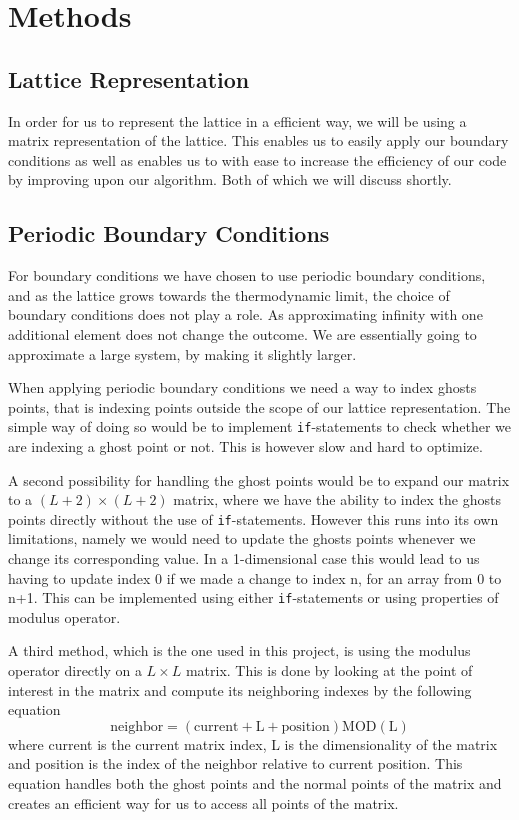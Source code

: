 \documentclass[%
reprint,
nofootinbib,
amsmath,amssymb,
aps,
]{revtex4-1}
\begin{document}
\section{Methods} %
\subsection{Lattice Representation} %
In order for us to represent the lattice in a efficient way, we will be using a matrix representation of the lattice. This enables us to easily apply our boundary conditions as well as enables us to with ease to increase the efficiency of our code by improving upon our algorithm. Both of which we will discuss shortly. 
\subsection{Periodic Boundary Conditions} %
For boundary conditions we have chosen to use periodic boundary conditions, and as the lattice grows towards the thermodynamic limit, the choice of boundary conditions does not play a role. As approximating infinity with one additional element does not change the outcome. We are essentially going to approximate a large system, by making it slightly larger. 

When applying periodic boundary conditions we need a way to index ghosts points, that is indexing points outside the scope of our lattice representation. The simple way of doing so would be to implement \texttt{if}-statements to check whether we are indexing a ghost point or not. This is however slow and hard to optimize. 

A second possibility for handling the ghost points would be to expand our matrix to a $(L+2)\times(L+2)$ matrix, where we have the ability to index the ghosts points directly without the use of \texttt{if}-statements. However this runs into its own limitations, namely we would need to update the ghosts points whenever we change its corresponding value. In a 1-dimensional case this would lead to us having to update index 0 if we made a change to index n, for an array from 0 to n+1. This can be implemented using either \texttt{if}-statements or using properties of modulus operator. 

A third method, which is the one used in this project, is using the modulus operator directly on a $L\times L$ matrix. This is done by looking at the point of interest in the matrix and compute its neighboring indexes by the following equation
\begin{equation}
	\text{neighbor} = (\text{current} + \text{L} + \text{position}) \text{MOD} (\text{L})
\end{equation}
where current is the current matrix index, L is the dimensionality of the matrix and position is the index of the neighbor relative to current position. 
This equation handles both the ghost points and the normal points of the matrix and creates an efficient way for us to access all points of the matrix. 
\end{document}
